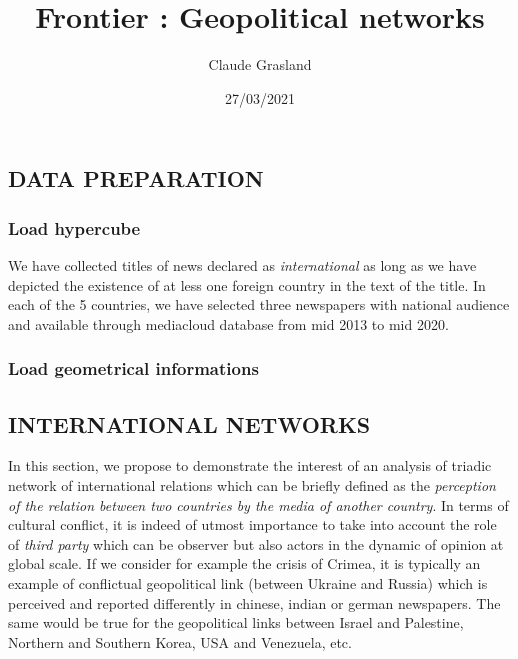\documentclass[
]{article}
\title{Frontier : Geopolitical networks}
\author{Claude Grasland}
\date{27/03/2021}
\begin{document}
\maketitle

\hypertarget{data-preparation}{%
\subsection{DATA PREPARATION}\label{data-preparation}}

\hypertarget{load-hypercube}{%
\subsubsection{Load hypercube}\label{load-hypercube}}

We have collected titles of news declared as \emph{international} as
long as we have depicted the existence of at less one foreign country in
the text of the title. In each of the 5 countries, we have selected
three newspapers with national audience and available through mediacloud
database from mid 2013 to mid 2020.

\hypertarget{load-geometrical-informations}{%
\subsubsection{Load geometrical
informations}\label{load-geometrical-informations}}

\hypertarget{international-networks}{%
\subsection{INTERNATIONAL NETWORKS}\label{international-networks}}

In this section, we propose to demonstrate the interest of an analysis
of triadic network of international relations which can be briefly
defined as the \emph{perception of the relation between two countries by
the media of another country}. In terms of cultural conflict, it is
indeed of utmost importance to take into account the role of \emph{third
party} which can be observer but also actors in the dynamic of opinion
at global scale. If we consider for example the crisis of Crimea, it is
typically an example of conflictual geopolitical link (between Ukraine
and Russia) which is perceived and reported differently in chinese,
indian or german newspapers. The same would be true for the geopolitical
links between Israel and Palestine, Northern and Southern Korea, USA and
Venezuela, etc.
\end{document}
